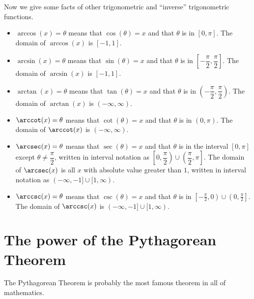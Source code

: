 \documentclass{ximera}
\begin{document}
Now we give some facts of other trigonometric and ``inverse''
trigonometric functions.

\begin{definition}\hfil
  \begin{itemize}
    \item $\arccos(x) = \theta$ means that $\cos(\theta) = x$ and
      that $\theta$ is in $[0, \pi]$. The domain of $\arccos(x)$ is $[-1, 1]$.
    \item $\arcsin(x) = \theta$ means that $\sin(\theta) = x$ and
      that $\theta$ is in $\left[-\dfrac{\pi}{2}, \dfrac{\pi}{2}\right]$. The domain of
      $\arcsin(x)$ is $[-1, 1]$.
    \item $\arctan(x) = \theta$ means that $\tan(\theta) = x$ and
      that $\theta$ is in $\left(-\dfrac{\pi}{2}, \dfrac{\pi}{2}\right)$. The domain of
      $\arctan(x)$ is $(-\infty, \infty)$.
    \item $\arccot(x) = \theta$ means that $\cot(\theta) = x$ and that 
      $\theta$ is in $(0, \pi)$. The domain of $\arccot(x)$ is
      $(-\infty, \infty)$.
    \item $\arcsec(x) = \theta$ means that $\sec(\theta) = x$ and
     that $\theta$ is in the interval $[0, \pi]$ except $\theta \neq \dfrac{\pi}{2}$, written in interval notation as $\left[0, \dfrac{\pi}{2}\right) \cup \left(\dfrac{\pi}{2}, \pi\right]$. 
     The domain of
      $\arcsec(x)$ is all $x$ with absolute value greater than $1$, written in interval notation as $(-\infty, -1] \cup [1, \infty)$.
    \item $\arccsc(x) = \theta$ means that $\csc(\theta) = x$ and
      that $\theta$ is in $\left[-\frac{\pi}{2}, 0\right) \cup \left(0, \frac{\pi}{2}\right]$. The
      domain of $\arccsc(x)$ is $(-\infty, -1] \cup [1, \infty)$.
  \end{itemize}
\end{definition}


\section{The power of the Pythagorean Theorem}

The Pythagorean Theorem is probably the most famous theorem in all of
mathematics.
\end{document}
